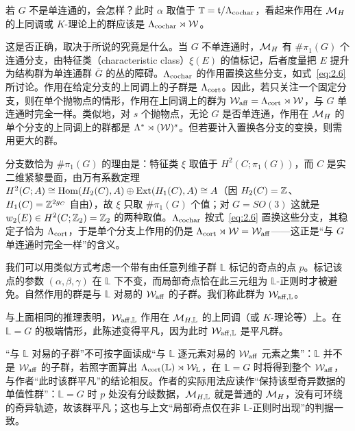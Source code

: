 \bigskip{}

若 $G$ 不是单连通的，会怎样？此时 $\alpha$ 取值于 ${\mathbb{T}}=\mathfrak t/ \Lambda_{\rm cochar}$，看起来作用在 ${{\mathcal{M}}_H}$ 的上同调或 $K$-理论上的群应该是 $\Lambda_{\rm cochar}\rtimes {\mathcal W}$。

这是否正确，取决于所说的究竟是什么。当 $G$ 不单连通时，${{\mathcal{M}}_H}$ 有 $\# \pi_1(G)$ 个连通分支，由特征类（characteristic class）$\xi(E)$ 的值标记，后者度量把 $E$ 提升为结构群为单连通群 $\bar G$ 的丛的障碍。$\Lambda_{\rm cochar}$ 的作用置换这些分支，如式~\eqref{eq:2.6} 所讨论。作用在给定分支的上同调上的子群是 $\Lambda_{{\rm cort}}$。因此，若只关注一个固定分支，则在单个抛物点的情形，作用在上同调上的群为 ${\mathcal W}_{\rm aff}=\Lambda_{{\rm cort}}\rtimes {\mathcal W}$，与 $G$ 单连通时完全一样。类似地，对 $s$ 个抛物点，无论 $G$ 是否单连通，作用在 ${{\mathcal{M}}_H}$ 的单个分支的上同调上的群都是 $\Lambda^*\rtimes ({\mathcal W})^s$。但若要计入置换各分支的变换，则需用更大的群。

\begin{yizhu}[含糊点拨]
分支数恰为 $\#\pi_1(G)$ 的理由是：特征类 $\xi$ 取值于 $H^2(C;\pi_1(G))$，而 $C$ 是实二维紧黎曼面，由万有系数定理 $H^2(C;A)\cong{\rm Hom}(H_2(C),A)\oplus{\rm Ext}(H_1(C),A)\cong A$（因 $H_2(C)={\mathbb{Z}}$、$H_1(C)={\mathbb{Z}}^{2g_C}$ 自由），故 $\xi$ 只取 $\#\pi_1(G)$ 个值；对 $G=SO(3)$ 这就是 $w_2(E)\in H^2(C;{\mathbb{Z}}_2)={\mathbb{Z}}_2$ 的两种取值。$\Lambda_{\rm cochar}$ 按式~\eqref{eq:2.6} 置换这些分支，其稳定子恰为 $\Lambda_{\rm cort}$，于是单个分支上作用的仍是 $\Lambda_{\rm cort}\rtimes{\mathcal W}={\mathcal W}_{\rm aff}$——这正是“与 $G$ 单连通时完全一样”的含义。
\end{yizhu}

\bigskip{}

我们可以用类似方式考虑一个带有由任意列维子群 $\mathbb{L}$ 标记的奇点的点 $p$。标记该点的参数 $(\alpha,\beta,\gamma)$ 在 $\mathbb{L}$ 下不变，而局部奇点恰在此三元组为 $\mathbb{L}$-正则时才被避免。自然作用的群是与 $\mathbb{L}$ 对易的 ${\mathcal W}_{\rm aff}$ 的子群。我们称此群为 ${\mathcal W}_{{\rm aff},\mathbb{L}}$。

与上面相同的推理表明，${\mathcal W}_{{\rm aff},\mathbb{L}}$ 作用在 ${\mathcal{M}}_{H,\mathbb{L}}$ 的上同调（或 $K$-理论等）上。在 $\mathbb{L}=G$ 的极端情形，此陈述变得平凡，因为此时 ${\mathcal W}_{{\rm aff},\mathbb{L}}$ 是平凡群。

\begin{yizhu}[易错点]
“与 $\mathbb{L}$ 对易的子群”不可按字面读成“与 $\mathbb{L}$ 逐元素对易的 ${\mathcal W}_{\rm aff}$ 元素之集”：$\mathbb{L}$ 并不是 ${\mathcal W}_{\rm aff}$ 的子群，若照字面算出 $\Lambda_{\rm cort}(\mathbb{L})\rtimes{\mathcal W}_{\mathbb{L}}$，在 $\mathbb{L}=G$ 时将得到整个 ${\mathcal W}_{\rm aff}$，与作者“此时该群平凡”的结论相反。作者的实际用法应读作“保持该型奇异数据的单值性群”：$\mathbb{L}=G$ 时 $p$ 处没有分歧数据，${\mathcal{M}}_{H,\mathbb{L}}$ 就是普通的 ${{\mathcal{M}}_H}$，没有可环绕的奇异轨迹，故该群平凡；这也与上文“局部奇点仅在非 $\mathbb{L}$-正则时出现”的判据一致。
\end{yizhu}

